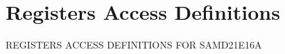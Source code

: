 \hypertarget{group___s_a_m_d21_e16_a__reg}{}\section{Registers Access Definitions}
\label{group___s_a_m_d21_e16_a__reg}
R\+E\+G\+I\+S\+T\+E\+RS A\+C\+C\+E\+SS D\+E\+F\+I\+N\+I\+T\+I\+O\+NS F\+OR S\+A\+M\+D21\+E16A 